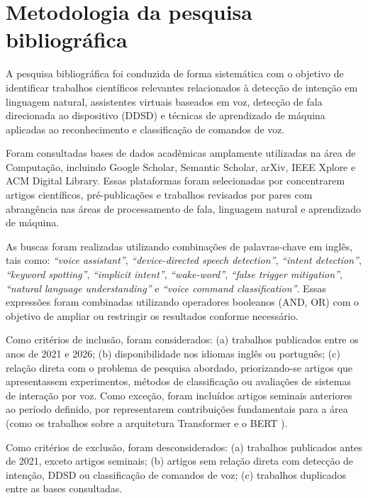 \documentclass[
    12pt,                %
    openright,           %
    oneside,             %
    a4paper,             %
    english,             %
    brazil               %
]{abntex2}
\begin{document}
\section{Metodologia da pesquisa bibliográfica}
\label{sec:metodologia_pesquisa}

A pesquisa bibliográfica foi conduzida de forma sistemática com o objetivo de identificar trabalhos científicos relevantes relacionados à detecção de intenção em linguagem natural, assistentes virtuais baseados em voz, detecção de fala direcionada ao dispositivo (DDSD) e técnicas de aprendizado de máquina aplicadas ao reconhecimento e classificação de comandos de voz.

Foram consultadas bases de dados acadêmicas amplamente utilizadas na área de Computação, incluindo Google Scholar, Semantic Scholar, arXiv, IEEE Xplore e ACM Digital Library. Essas plataformas foram selecionadas por concentrarem artigos científicos, pré-publicações e trabalhos revisados por pares com abrangência nas áreas de processamento de fala, linguagem natural e aprendizado de máquina.

As buscas foram realizadas utilizando combinações de palavras-chave em inglês, tais como: \textit{``voice assistant''}, \textit{``device-directed speech detection''}, \textit{``intent detection''}, \textit{``keyword spotting''}, \textit{``implicit intent''}, \textit{``wake-word''}, \textit{``false trigger mitigation''}, \textit{``natural language understanding''} e \textit{``voice command classification''}. Essas expressões foram combinadas utilizando operadores booleanos (AND, OR) com o objetivo de ampliar ou restringir os resultados conforme necessário.

Como critérios de inclusão, foram considerados: (a) trabalhos publicados entre os anos de 2021 e 2026; (b) disponibilidade nos idiomas inglês ou português; (c) relação direta com o problema de pesquisa abordado, priorizando-se artigos que apresentassem experimentos, métodos de classificação ou avaliações de sistemas de interação por voz. Como exceção, foram incluídos artigos seminais anteriores ao período definido, por representarem contribuições fundamentais para a área (como os trabalhos sobre a arquitetura Transformer \cite{Vaswani2017} e o BERT \cite{Devlin2019}).

Como critérios de exclusão, foram desconsiderados: (a) trabalhos publicados antes de 2021, exceto artigos seminais; (b) artigos sem relação direta com detecção de intenção, DDSD ou classificação de comandos de voz; (c) trabalhos duplicados entre as bases consultadas.
\end{document}
